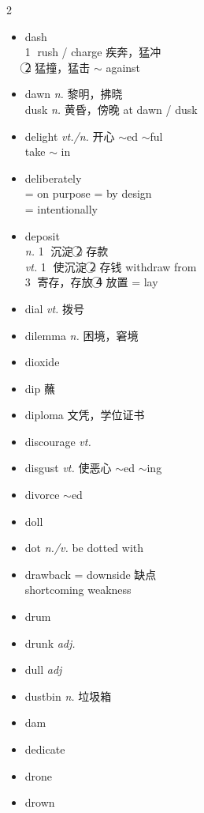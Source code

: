 \documentclass[../../book.tex]{subfiles}
\begin{document}
\begin{multicols}{2}
\begin{itemize}
\item[-] dash
\\\textcircled{1} rush / charge 疾奔，猛冲
\\\textcircled{2} 猛撞，猛击 $\sim$ against
\item[-] dawn \emph{n.} 黎明，拂晓
\\dusk \emph{n.} 黄昏，傍晚 at dawn / dusk
\item[-] delight \emph{vt./n.} 开心 $\sim$ed $\sim$ful
\\take $\sim$ in
\item[-] deliberately
\\= on purpose = by design \\= intentionally
\item[-] deposit 
\\\emph{n.} \textcircled{1} 沉淀 \textcircled{2} 存款
\\\emph{vt.} \textcircled{1} 使沉淀 \textcircled{2} 存钱 withdraw from
\\\textcircled{3} 寄存，存放 \textcircled{4} 放置 = lay 
\item[-] dial \emph{vt.} 拨号
\item[-] dilemma \emph{n.} 困境，窘境
\item[-] dioxide
\item[-] dip 蘸
\item[-] diploma 文凭，学位证书
\item[-] discourage \emph{vt.}
\item[-] disgust \emph{vt.} 使恶心 $\sim$ed $\sim$ing
\item[-] divorce \phantom{a} $\sim$ed
\item[-] doll
\item[-] dot \emph{n./v.} be dotted with
\item[-] drawback = downside 缺点
\\shortcoming weakness
\item[-] drum
\item[-] drunk \emph{adj.}
\item[-] dull \emph{adj}
\item[-] dustbin \emph{n.} 垃圾箱
\item[-] dam
\item[-] dedicate
\item[-] drone
\item[-] drown
\end{itemize}
\end{multicols}
\end{document}
